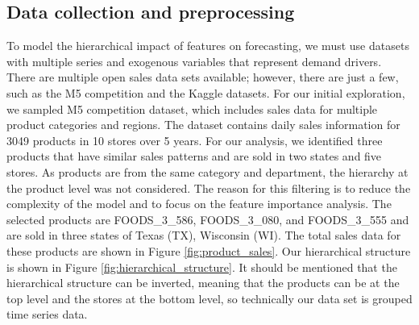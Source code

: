 
\subsection{Data collection and preprocessing}\label{subsec:data-collection-and-preprocessing}

To model the hierarchical impact of features on forecasting, we must use datasets with multiple series and exogenous variables that represent demand drivers.
There are multiple open sales data sets available; however, there are just a few, such as the M5 competition\citep{makridakis_m5_2022} and the Kaggle datasets\cite{favorita-sales}.
For our initial exploration, we sampled M5 competition\citep{makridakis_m5_2022} dataset, which includes sales data for multiple product categories and regions.
The dataset contains daily sales information for 3049 products in 10 stores over 5 years.
For our analysis, we identified three products that have similar sales patterns and are sold in two states and five stores.
As products are from the same category and department, the hierarchy at the product level was not considered.
The reason for this filtering is to reduce the complexity of the model and to focus on the feature importance analysis.
The selected products are FOODS\_3\_586, FOODS\_3\_080, and FOODS\_3\_555 and are sold in three states of Texas (TX), Wisconsin (WI).
The total sales data for these products are shown in Figure \ref{fig:product_sales}.
Our hierarchical structure is shown in Figure \ref{fig:hierarchical_structure}.
It should be mentioned that the hierarchical structure can be inverted, meaning that the products can be at the top level and the stores at the bottom level,
so technically our data set is grouped time series data.

